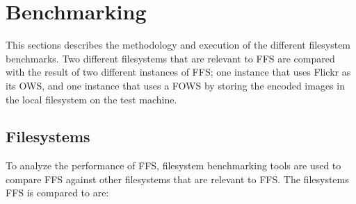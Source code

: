 \section{Benchmarking}
This sections describes the methodology and execution of the different filesystem benchmarks. Two different filesystems that are relevant to FFS are compared with the result of two different instances of FFS; one instance that uses Flickr as its OWS, and one instance that uses a FOWS by storing the encoded images in the local filesystem on the test machine.

\subsection{Filesystems}
To analyze the performance of FFS, filesystem benchmarking tools are used to compare FFS against other filesystems that are relevant to FFS. The filesystems FFS is compared to are:

